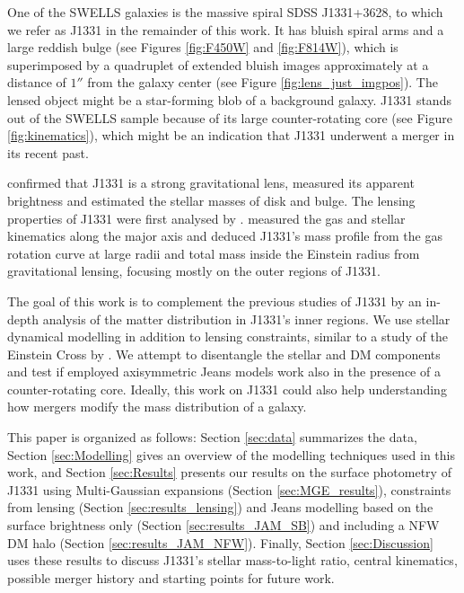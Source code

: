 \documentclass[useAMS,usenatbib]{mnras}
\begin{document}
One of the SWELLS galaxies is the massive spiral SDSS J1331+3628, to which we refer as J1331 in the remainder of this work. It has bluish spiral arms and a large reddish bulge (see Figures \ref{fig:F450W} and \ref{fig:F814W}), which is superimposed by a quadruplet of extended bluish images approximately at a distance of $1''$ from the galaxy center (see Figure \ref{fig:lens_just_imgpos}). The lensed object might be a star-forming blob of a background galaxy. J1331 stands out of the SWELLS sample because of its large counter-rotating core (see Figure \ref{fig:kinematics}), which might be an indication that J1331 underwent a merger in its recent past.

\citet{SWELLSI} confirmed that J1331 is a strong gravitational lens, measured its apparent brightness and estimated the stellar masses of disk and bulge. The lensing properties of J1331 were first analysed by \citet{SWELLSIII}. \citet{SWELLSV} measured the gas and stellar kinematics along the major axis and deduced J1331's mass profile from the gas rotation curve at large radii and total mass inside the Einstein radius from gravitational lensing, focusing mostly on the outer regions of J1331.

The goal of this work is to complement the previous studies of J1331 by an in-depth analysis of the matter distribution in J1331's inner regions. We use stellar dynamical modelling in addition to lensing constraints, similar to a study of the Einstein Cross by \citet{GlennEC}. We attempt to disentangle the stellar and DM components and test if employed axisymmetric Jeans models work also in the presence of a counter-rotating core. Ideally, this work on J1331 could also help understanding how mergers modify the mass distribution of a galaxy.

This paper is organized as follows: Section \ref{sec:data} summarizes the data, Section \ref{sec:Modelling} gives an overview of the modelling techniques used in this work, and Section \ref{sec:Results} presents our results on the surface photometry of J1331 using Multi-Gaussian expansions (Section \ref{sec:MGE_results}), constraints from lensing (Section \ref{sec:results_lensing}) and Jeans modelling based on the surface brightness only (Section \ref{sec:results_JAM_SB}) and including a NFW DM halo (Section \ref{sec:results_JAM_NFW}). Finally, Section \ref{sec:Discussion} uses these results to discuss J1331's stellar mass-to-light ratio, central kinematics, possible merger history and starting points for future work.
\end{document}
